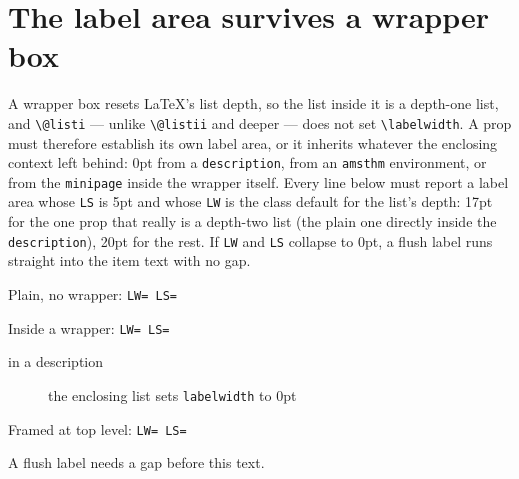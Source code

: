\documentclass{article}
\begin{document}
\section{The label area survives a wrapper box}

A wrapper box resets \LaTeX's list depth, so the list inside it is a depth-one
list, and \verb|\@listi| --- unlike \verb|\@listii| and deeper --- does not set
\verb|\labelwidth|.  A prop must therefore establish its own label area, or it
inherits whatever the enclosing context left behind: 0pt from a
\texttt{description}, from an \texttt{amsthm} environment, or from the
\texttt{minipage} inside the wrapper itself.  Every line below must report a
label area whose \texttt{LS} is 5pt and whose \texttt{LW} is the class default
for the list's depth: 17pt for the one prop that really is a depth-two list
(the plain one directly inside the \texttt{description}), 20pt for the rest.
If \texttt{LW} and \texttt{LS} collapse to 0pt, a flush label runs straight
into the item text with no gap.

\newcommand\dims{\texttt{LW=\the{}\ LS=\the{}}}

\begin{prop}
  \item Plain, no wrapper: \dims
\end{prop}

\begin{prop}[wrapper begin = {\begin{mdframed}}, wrapper end = {\end{mdframed}}]
  \item Inside a wrapper: \dims
\end{prop}

\begin{description}
\item[in a description] the enclosing list sets \texttt{labelwidth} to 0pt
\end{description}

\begin{prop}[style=framed]
  \item Framed at top level: \dims
  \item[name=Note, align=flush] A flush label needs a gap before this text.
\end{prop}
\end{document}
